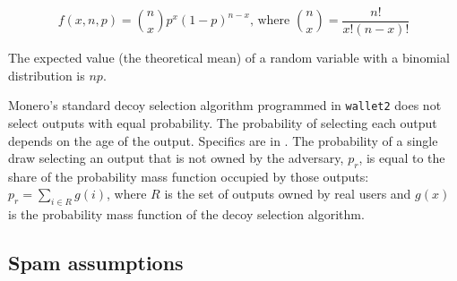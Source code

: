\documentclass[usletter,11pt,english,openany]{article}
\begin{document}
\begin{equation}
f(x,n,p)=\binom{n}{x}p^{x}\left(1-p\right)^{n-x}\textrm{, where }\binom{n}{x}=\frac{n!}{x!(n-x)!}
\end{equation}

The expected value (the theoretical mean) of a random variable with
a binomial distribution is $np$.

Monero's standard decoy selection algorithm programmed in \texttt{wallet2}
does not select outputs with equal probability. The probability of
selecting each output depends on the age of the output. Specifics
are in \cite{Rucknium2023a}. The probability of a single draw selecting
an output that is not owned by the adversary, $p_{r}$, is equal to
the share of the probability mass function occupied by those outputs:
$p_{r}=\sum_{i\in R}g(i)$, where $R$ is the set of outputs owned
by real users and $g(x)$ is the probability mass function of the
decoy selection algorithm.

\subsection{Spam assumptions\label{subsec:spam-assumptions}}
\end{document}

